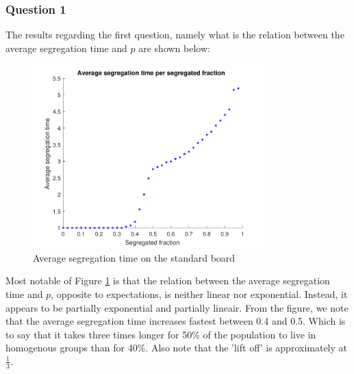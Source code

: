 \subsubsection{Question 1}
The results regarding the first question, namely what is the relation between the average segregation time and \(p\) are shown below:\\
\begin{figure}[H]
    \centering
    \includegraphics[width=0.8\textwidth]{aveseg_sb_2}
    \caption{Average segregation time on the standard board}
    \label{fig:avesegsb}
\end{figure}

Most notable of Figure \ref{fig:avesegsb} is that the relation between the average segregation time and \(p\), opposite to expectations, is neither linear nor exponential. Instead, it appears to be partially exponential and partially lineair. From the figure, we note that the average segregation time increases fastest between 0.4 and 0.5. 
Which is to say that it takes three times longer for 50\% of the population to live in homogenous groups than for 40\%.
Also note that the 'lift off' is approximately at $\frac{1}{3}$.\\

